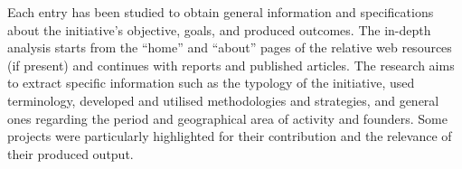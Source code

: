 \newline
Each entry has been studied to obtain general information and specifications about the initiative’s objective, goals, and produced outcomes. The in-depth analysis starts from the ``home'' and ``about'' pages of the relative web resources (if present) and continues with reports and published articles. The research aims to extract specific information such as the typology of the initiative, used terminology, developed and utilised methodologies and strategies, and general ones regarding the period and geographical area of activity and founders. Some projects were particularly highlighted for their contribution and the relevance of their produced output.

